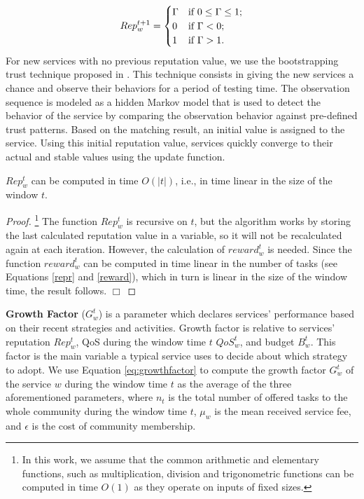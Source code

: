 \begin{equation}\label{repz}
Rep_{w}^{t+1} = \begin{cases}

\Gamma & \text{if $ 0 \leq \Gamma \leq 1$;}\\
0  & \text{if $\Gamma < 0$;}\\
1 & \text{if $\Gamma > 1$.}\\
\end{cases}
\end{equation}
%
For new services with no previous reputation value, we use the
bootstrapping trust technique proposed in \cite{DBLP:conf/icwe/YahyaouiZ11}. This
technique consists in giving the new services a chance and observe
their behaviors for a period of testing time. The observation
sequence is modeled as a hidden Markov model that is used to
detect the behavior of the service by comparing the observation
behavior against pre-defined trust patterns. Based on the matching
result, an initial value is assigned to the service. Using this
initial reputation value, services quickly converge to their
actual and stable values using the update function.

\begin{proposition}\label{Complexity-Rep}
$Rep_{w}^{t}$ can be computed in time $O(|t|)$, i.e., in time
linear in the size of the window $t$.
\end{proposition}

\begin{proof}\footnote{In this work, we
assume that the common arithmetic and elementary functions, such
as multiplication, division and trigonometric functions can be
computed in time $O(1)$ as they operate on inputs of fixed sizes.}
The function $Rep_{w}^{t}$ is recursive on $t$, but the algorithm
works by storing the last calculated reputation value in a
variable, so it will not be recalculated again at each iteration.
However, the calculation of $reward_w^t$ is needed. Since the
function $reward_w^t$ can be computed in time linear in the number
of tasks (see Equations \ref{repr} and \ref{reward}), which in
turn is linear in the size of the window time, the result follows.
$\Box$
\end{proof}

\textbf{Growth Factor} ($G_w^t$) is a parameter which declares
services' performance based on their recent strategies and
activities. Growth factor is relative to services' reputation
$Rep_w^t$, QoS during the window time $t$ $QoS_w^t$, and budget
$B_w^t$. This factor is the main variable a typical service uses
to decide about which strategy to adopt. We use Equation \ref{eq:growthfactor} to compute the
growth factor $G^t_w$ of the service $w$ during the window time
$t$ as the average of the three aforementioned parameters, where
$n_t$ is the total number of offered tasks to the whole community
during the
window time $t$, %
$\mu_w$ is the mean received service fee, and $\epsilon$ is the
cost of community membership.

